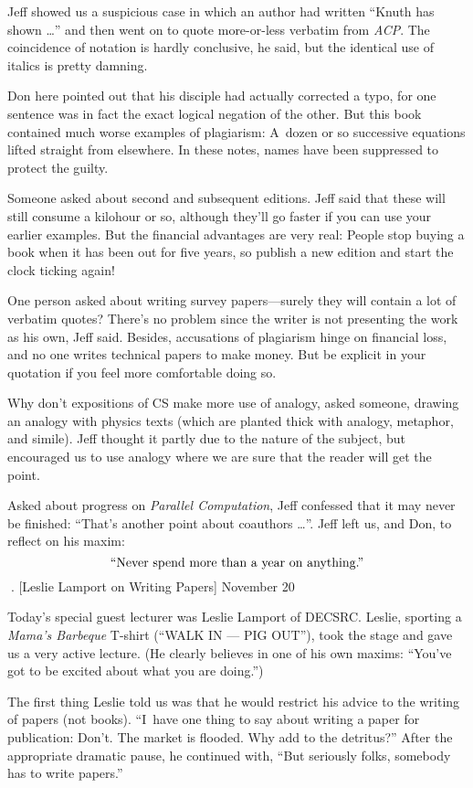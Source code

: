 Jeff showed us a suspicious case in which an author had written ``Knuth
has shown \dots'' and then went on to quote more-or-less verbatim from
{\sl ACP}. The coincidence of notation is hardly conclusive, he said,
but the identical use of italics is pretty damning.

Don here pointed out that his disciple had actually corrected a typo,
 for one sentence was in fact the exact logical negation
of the other. But this book contained much worse examples of plagiarism:
A~dozen or so
 successive equations lifted straight from elsewhere. In these
notes, names have been suppressed to protect the guilty.

Someone asked about second and subsequent editions. Jeff said that these
will still consume a kilohour or so, although they'll go faster if you
can use your earlier examples. But the financial advantages are very
real: People stop buying a book when it has been out for five years,
so publish a new edition and start the clock ticking again!

One person asked about writing survey papers---surely they will
contain a lot of verbatim quotes? There's no problem since the writer
is not presenting the work as his own, Jeff said.  Besides,
accusations of plagiarism hinge on financial loss, and no one writes
technical papers to make money.  But be explicit in your quotation if
you feel more comfortable doing so.

Why don't expositions of CS make more use of analogy, asked someone,
drawing an analogy with physics texts (which are planted thick with
analogy, metaphor, and simile). Jeff thought it partly due to the
nature of the subject, but encouraged us to use analogy where we are
sure that the reader will get the point.

Asked about progress on {\sl Parallel Computation}, Jeff confessed
that it may never be finished: ``That's another point about
coauthors \dots''.  Jeff left us, and Don, to reflect on his maxim:
$$\hbox{``Never spend more than a year on anything.''}$$
. [Leslie Lamport on Writing Papers] \tll November 20

Today's special guest lecturer was Leslie Lamport of DECSRC.
Leslie, sporting a {\it Mama's Barbeque\/} T-shirt (``WALK
IN --- PIG OUT''), took the stage and gave us a very active lecture. (He
clearly believes in one of his own maxims: ``You've got to be excited about
what you are doing.'')

The first thing  Leslie told us was that he would restrict his
advice to the writing of papers (not books).  ``I~have one
thing to say about writing a paper for publication: Don't. The market
is flooded.  Why add to the detritus?''  After the appropriate dramatic
pause, he continued with, ``But seriously folks, somebody has to write
papers.''

